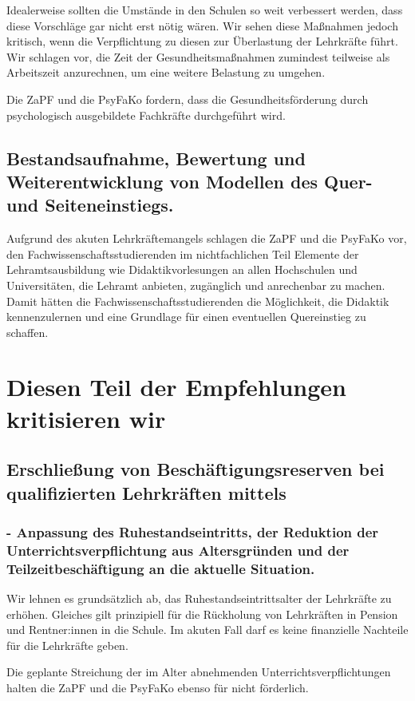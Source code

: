 \documentclass[DIV=calc]{scrartcl}
\begin{document}
Idealerweise sollten die Umstände in den Schulen so weit verbessert werden, dass diese Vorschläge gar nicht erst nötig wären.
Wir sehen diese Maßnahmen jedoch kritisch, wenn die Verpflichtung zu diesen zur Überlastung der Lehrkräfte führt.
Wir schlagen vor, die Zeit der Gesundheitsmaßnahmen zumindest teilweise als Arbeitszeit anzurechnen, um eine weitere Belastung zu umgehen.

Die ZaPF und die PsyFaKo fordern, dass die Gesundheitsförderung durch psychologisch ausgebildete Fachkräfte durchgeführt wird.

\subsection*{Bestandsaufnahme, Bewertung und Weiterentwicklung von Modellen des Quer- und Seiteneinstiegs.}
Aufgrund des akuten Lehrkräftemangels schlagen die ZaPF und die PsyFaKo vor, den Fachwissenschaftsstudierenden im nichtfachlichen Teil Elemente der Lehramtsausbildung wie Didaktikvorlesungen an allen Hochschulen und Universitäten, die Lehramt anbieten, zugänglich und anrechenbar zu machen.
Damit hätten die Fachwissenschaftsstudierenden die Möglichkeit, die Didaktik kennenzulernen und eine Grundlage für einen eventuellen Quereinstieg zu schaffen.

\section*{Diesen Teil der Empfehlungen kritisieren wir}
\subsection*{Erschließung von Beschäftigungsreserven bei qualifizierten Lehrkräften mittels}
\subsubsection*{- Anpassung des Ruhestandseintritts, der Reduktion der Unterrichtsverpflichtung aus Altersgründen und der Teilzeitbeschäftigung an die aktuelle Situation.}
Wir lehnen es grundsätzlich ab, das Ruhestandseintrittsalter der Lehrkräfte zu erhöhen.
Gleiches gilt prinzipiell für die Rückholung von Lehrkräften in Pension und Rentner:innen in die Schule. Im akuten Fall darf es keine finanzielle Nachteile für die Lehrkräfte geben. 

Die geplante Streichung der im Alter abnehmenden Unterrichtsverpflichtungen halten die ZaPF und die PsyFaKo ebenso für nicht förderlich.
\end{document}
